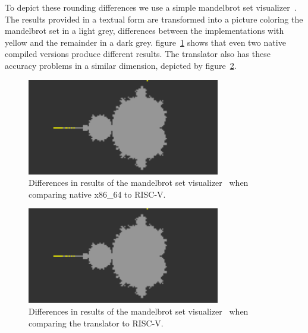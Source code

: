 \documentclass[course=eragp]{aspdoc}
\begin{document}
\par

To depict these rounding differences we use a simple mandelbrot set
visualizer~\cite{mandelbrot_program}. The results provided in a textual form are transformed into a
picture coloring the mandelbrot set in a light grey, differences between the implementations with
yellow and the remainder in a dark grey. figure~\ref{fig:mandelbrot_diff_native_x86} shows that even
two native compiled versions produce different results. The translator also has these accuracy
problems in a similar dimension, depicted by figure~\ref{fig:mandelbrot_diff_translator}.

\par

\begin{figure}[ht]
    \centering
    \includegraphics[width=0.75\textwidth]{images/mandelbrot_differences/x86_diff.png}
    \caption{Differences in results of the mandelbrot set visualizer~\cite{mandelbrot_program} when
        comparing native x86\_64 to RISC-V.}
    \label{fig:mandelbrot_diff_native_x86}
\end{figure}

\begin{figure}[ht]
    \centering
    \includegraphics[width=0.75\textwidth]{images/mandelbrot_differences/translated_diff.png}
    \caption{Differences in results of the mandelbrot set visualizer~\cite{mandelbrot_program} when
        comparing the translator to RISC-V.}
    \label{fig:mandelbrot_diff_translator}
\end{figure}
\end{document}
